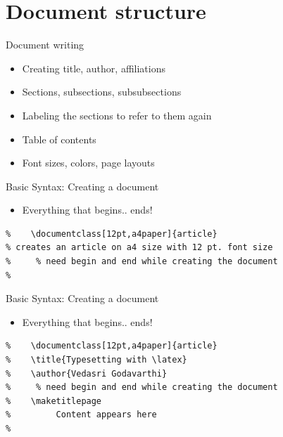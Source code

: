 \section{Document structure}
\label{sec:structure}
\frame[plain]{\sectionpage}


\begin{frame}{Document writing}
    \begin{itemize}
        \item<1-> Creating title, author, affiliations
        \item <2-> Sections, subsections, subsubsections
        \item <3-> Labeling the sections to refer to them again
        \item <4-> Table of contents
        \item <5-> Font sizes, colors, page layouts
    \end{itemize}
\end{frame}

\begin{frame}[fragile]{Basic Syntax: Creating a document}
\begin{itemize}
    \item Everything that begins.. ends!
\end{itemize}
\begin{verbatim}
%    \documentclass[12pt,a4paper]{article} 
% creates an article on a4 size with 12 pt. font size 
%     % need begin and end while creating the document
%    
\end{verbatim}
\end{frame}

\begin{frame}[fragile]{Basic Syntax: Creating a document}
\begin{itemize}
    \item Everything that begins.. ends!
\end{itemize}
\begin{verbatim}
%    \documentclass[12pt,a4paper]{article} 
%    \title{Typesetting with \latex}
%    \author{Vedasri Godavarthi}
%     % need begin and end while creating the document
%    \maketitlepage
%         Content appears here
%    
\end{verbatim}
\end{frame}

